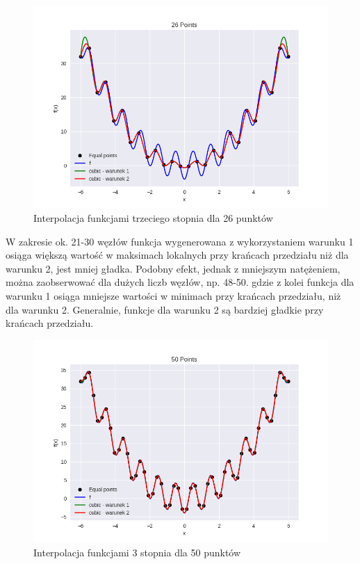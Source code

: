 \documentclass{article}
\begin{document}
\begin{figure}[H]
    \centering
    \includegraphics[width=\textwidth]{img/cubic_26.png}
    \caption{Interpolacja funkcjami trzeciego stopnia dla 26 punktów}
\end{figure}

W zakresie ok. 21-30 węzłów funkcja wygenerowana z wykorzystaniem warunku 1 osiąga większą wartość w maksimach lokalnych przy krańcach przedziału
niż dla warunku 2, jest mniej gładka. Podobny efekt, jednak z mniejszym natężeniem, można zaobserwować dla dużych liczb węzłów, np. 48-50. gdzie
z kolei funkcja dla warunku 1 osiąga mniejsze wartości w minimach przy krańcach przedziału, niż dla warunku 2. Generalnie, funkcje dla warunku 2
są bardziej gładkie przy krańcach przedziału.

\begin{figure}[H]
    \centering
    \includegraphics[width=\textwidth]{img/cubic_50.png}
    \caption{Interpolacja funkcjami 3 stopnia dla 50 punktów}
\end{figure}
\end{document}
